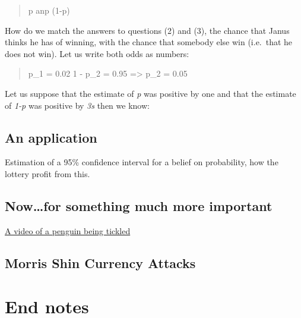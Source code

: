 \documentclass[a4paper]{book}\usepackage{graphicx, color}
\begin{document}
\begin{quote}
p anp (1-p)
\end{quote}

How do we match the answers to questions (2) and (3), the chance that
Janus thinks he has of winning, with the chance that somebody else win
(i.e.~that he does not win). Let us write both odds as numbers:

\begin{quote}
p\_1 = 0.02 1 - p\_2 = 0.95 =\textgreater{} p\_2 = 0.05
\end{quote}

Let us suppose that the estimate of \emph{p} was positive by one and
that the estimate of \emph{1-p} was positive by \emph{3s} then we know:


\section{An application}

Estimation of a 95\% confidence interval for a belief on probability,
how the lottery profit from this.

\section{Now\ldots{}for something much more important}

\href{http://www.youtube.com/watch?v=FVwtTrlPSSk}{A video of a penguin
being tickled}

\begin{refsection}
\chapter{Morris Shin Currency Attacks}

\parencite{morris1998unique}
\printbibliography
\end{refsection}

\backmatter
\chapter{End notes}
\end{document}
